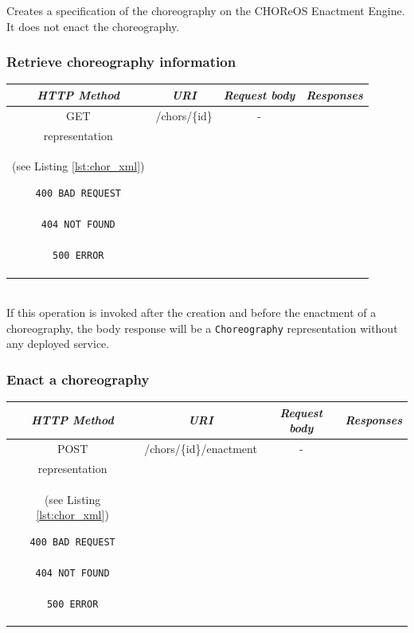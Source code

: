 \documentclass[a4paper, 10pt]{article}
\newcommand{\ee}{CHOReOS Enactment Engine}
\begin{document}
Creates a specification of the choreography on the \ee.
It does not enact the choreography. \\

\subsubsection*{Retrieve choreography information}

\begin{tabular}{|c|c|c|c|}
\hline 
\itshape{HTTP Method} & \itshape{URI} & \itshape{Request body} & \itshape{Responses} \\ 
\hline 
GET & /chors/\{id\} & - &
\begin{minipage}{2in}
\begin{verbatim}

200 OK
location = "/chors/{id}"

Body: 
\end{verbatim}
\verb!Choreography! XML \\
representation \\
(see Listing \ref{lst:chor_xml})
\begin{verbatim}
400 BAD REQUEST

404 NOT FOUND

500 ERROR

\end{verbatim}
\end{minipage} 
\\ 
\hline 
\end{tabular} \\

If this operation is invoked after the creation and before the enactment of a choreography, the body response will be a \verb!Choreography! representation without any deployed service.

\subsubsection*{Enact a choreography}

\begin{tabular}{|c|c|c|c|}
\hline 
\itshape{HTTP Method} & \itshape{URI} & \itshape{Request body} & \itshape{Responses} \\ 
\hline 
POST & /chors/\{id\}/enactment & - &
\begin{minipage}{2in}
\begin{verbatim}

200 OK
location = "/chors/{id}"
Body: 
\end{verbatim}
\verb!Choreography! XML \\
representation \\
(see Listing \ref{lst:chor_xml})
\begin{verbatim}
400 BAD REQUEST

404 NOT FOUND

500 ERROR

\end{verbatim}
\end{minipage} 
\\ 
\hline 
\end{tabular} \\
\end{document}
